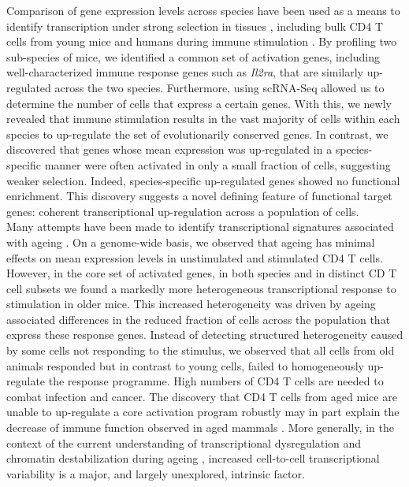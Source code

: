 Comparison of gene expression levels across species have been used as a means to identify transcription under strong selection in tissues \citep{Sudmant2015, Brawand2011, Romero2012, Barbosa-Morais2012, Perry2012}, including bulk CD4\plus{} T cells from young mice and humans during immune stimulation \citep{Shay2013}. By profiling two sub-species of mice, we identified a common set of activation genes, including well-characterized immune response genes such as \textit{Il2ra}, that are similarly up-regulated across the two species. Furthermore, using scRNA-Seq allowed us to determine the number of cells that express a certain genes. With this, we newly revealed that immune stimulation results in the vast majority of cells within each species to up-regulate the set of evolutionarily conserved genes. In contrast, we discovered that genes whose mean expression was up-regulated in a species-specific manner were often activated in only a small fraction of cells, suggesting weaker selection. Indeed, species-specific up-regulated genes showed no functional enrichment. This discovery suggests a novel defining feature of functional target genes: coherent transcriptional up-regulation across a population of cells. \\

Many attempts have been made to identify transcriptional signatures associated with ageing \citep{DeMagalhaes2009, Magalhaes2009, Chen2013, Kowalczyk2015}. On a genome-wide basis, we observed that ageing has minimal effects on mean expression levels in unstimulated and stimulated CD4\plus{} T cells. However, in the core set of activated genes, in both species and in distinct CD\plus{} T cell subsets we found a markedly more heterogeneous transcriptional response to stimulation in older mice. This increased heterogeneity was driven by ageing associated differences in the reduced fraction of cells across the population that express these response genes. Instead of detecting structured heterogeneity caused by some cells not responding to the stimulus, we observed that all cells from old animals responded but in contrast to young cells, failed to homogeneously up-regulate the response programme. High numbers of CD4\plus{} T cells are needed to combat infection and cancer. The discovery that CD4\plus{} T cells from aged mice are unable to up-regulate a core activation program robustly may in part explain the decrease of immune function observed in aged mammals \citep{Goronzy2013, Nikolich-Zugich2018}. More generally, in the context of the current understanding of transcriptional dysregulation and chromatin destabilization during ageing \citep{Booth2016}, increased cell-to-cell transcriptional variability is a major, and largely unexplored, intrinsic factor.\\

